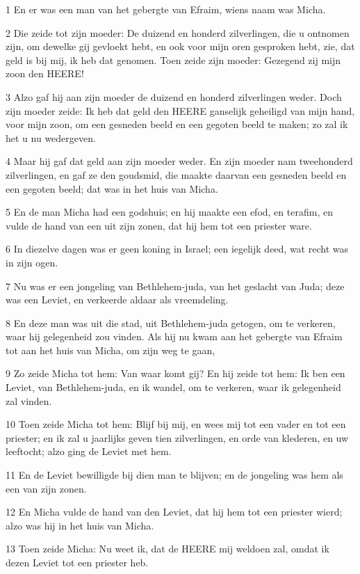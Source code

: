 \par 1 En er was een man van het gebergte van Efraim, wiens naam was Micha.
\par 2 Die zeide tot zijn moeder: De duizend en honderd zilverlingen, die u ontnomen zijn, om dewelke gij gevloekt hebt, en ook voor mijn oren gesproken hebt, zie, dat geld is bij mij, ik heb dat genomen. Toen zeide zijn moeder: Gezegend zij mijn zoon den HEERE!
\par 3 Alzo gaf hij aan zijn moeder de duizend en honderd zilverlingen weder. Doch zijn moeder zeide: Ik heb dat geld den HEERE ganselijk geheiligd van mijn hand, voor mijn zoon, om een gesneden beeld en een gegoten beeld te maken; zo zal ik het u nu wedergeven.
\par 4 Maar hij gaf dat geld aan zijn moeder weder. En zijn moeder nam tweehonderd zilverlingen, en gaf ze den goudsmid, die maakte daarvan een gesneden beeld en een gegoten beeld; dat was in het huis van Micha.
\par 5 En de man Micha had een godshuis; en hij maakte een efod, en terafim, en vulde de hand van een uit zijn zonen, dat hij hem tot een priester ware.
\par 6 In diezelve dagen was er geen koning in Israel; een iegelijk deed, wat recht was in zijn ogen.
\par 7 Nu was er een jongeling van Bethlehem-juda, van het geslacht van Juda; deze was een Leviet, en verkeerde aldaar als vreemdeling.
\par 8 En deze man was uit die stad, uit Bethlehem-juda getogen, om te verkeren, waar hij gelegenheid zou vinden. Als hij nu kwam aan het gebergte van Efraim tot aan het huis van Micha, om zijn weg te gaan,
\par 9 Zo zeide Micha tot hem: Van waar komt gij? En hij zeide tot hem: Ik ben een Leviet, van Bethlehem-juda, en ik wandel, om te verkeren, waar ik gelegenheid zal vinden.
\par 10 Toen zeide Micha tot hem: Blijf bij mij, en wees mij tot een vader en tot een priester; en ik zal u jaarlijks geven tien zilverlingen, en orde van klederen, en uw leeftocht; alzo ging de Leviet met hem.
\par 11 En de Leviet bewilligde bij dien man te blijven; en de jongeling was hem als een van zijn zonen.
\par 12 En Micha vulde de hand van den Leviet, dat hij hem tot een priester wierd; alzo was hij in het huis van Micha.
\par 13 Toen zeide Micha: Nu weet ik, dat de HEERE mij weldoen zal, omdat ik dezen Leviet tot een priester heb.

